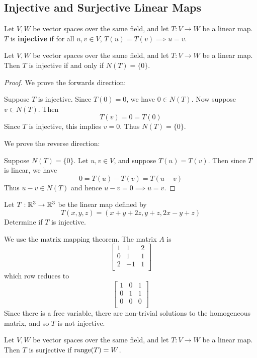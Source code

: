 \documentclass{article}
\begin{document}
\subsection{Injective and Surjective Linear Maps}
\begin{definition}
  Let $V, W$ be vector spaces over the same field, and let $T: V \to W$ be a linear map. $T$ is \textbf{injective} if for all $u, v \in V$, $T(u) = T(v) \implies u = v$.
\end{definition}
\begin{theorem}
  Let $V, W$ be vector spaces over the same field, and let $T: V \to W$ be a linear map. Then $T$ is injective if and only if $N(T) = \{0\}$.
\end{theorem}
\begin{proof}
  We prove the forwards direction:

  Suppose $T$ is injective. Since $T(0) = 0$, we have $0 \in N(T)$. Now suppose $v \in N(T)$. Then \[
    T(v) = 0 = T(0)
  \]
  Since $T$ is injective, this implies $v = 0$. Thus $N(T) = \{0\}$.

  We prove the reverse direction:

  Suppose $N(T) = \{0\}$. Let $u, v \in V$, and suppose $T(u) = T(v)$. Then since $T$ is linear, we have \[
    0 = T(u) - T(v) = T(u-v)
  \]
  Thus $u-v \in N(T)$ and hence $u-v = 0 \implies u = v$.
\end{proof}
\begin{example}
  Let $T: \mathbb{R}^3 \to \mathbb{R}^3$ be the linear map defined by \[
    T(x, y, z) = (x + y + 2z, y + z, 2x - y + z)
  \]
  Determine if $T$ is injective.

  We use the matrix mapping theorem. The matrix $A$ is \[
    \begin{bmatrix}
      1 & 1  & 2 \\
      0 & 1  & 1 \\
      2 & -1 & 1 \\
    \end{bmatrix}
  \] which row reduces to \[
    \begin{bmatrix}
      1 & 0 & 1 \\
      0 & 1 & 1 \\
      0 & 0 & 0 \\
    \end{bmatrix}
  \]
  Since there is a free variable, there are non-trivial solutions to the homogeneous matrix, and so $T$ is not injective.
\end{example}
\begin{definition}
  Let $V, W$ be vector spaces over the same field, and let $T: V \to W$ be a linear map. Then $T$ is surjective if $\operatorname{\text{range}}(T) = W$.
\end{definition}
\end{document}
